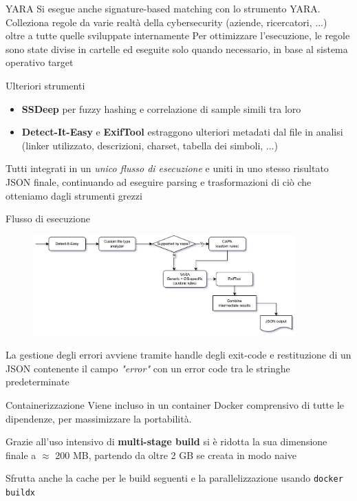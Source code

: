 \begin{frame}{YARA}
Si esegue anche signature-based matching con lo strumento YARA.
\vfill
Colleziona regole da varie realtà della cybersecurity (aziende, ricercatori, ...) \\
oltre a tutte quelle sviluppate internamente
\vfill
Per ottimizzare l'esecuzione, le regole sono state divise in cartelle ed eseguite solo quando necessario, in base al sistema operativo target
\end{frame}

\begin{frame}{Ulteriori strumenti}
\begin{itemize}
    \item \textbf{SSDeep} per fuzzy hashing e correlazione di sample simili tra loro
    \item \textbf{Detect-It-Easy} e \textbf{ExifTool} estraggono ulteriori metadati dal file in analisi (linker utilizzato, descrizioni, charset, tabella dei simboli, ...)
\end{itemize}

\vfill

Tutti integrati in un \emph{unico flusso di esecuzione} e uniti in uno stesso risultato JSON finale, continuando ad eseguire parsing e trasformazioni di ciò che otteniamo dagli strumenti grezzi
\end{frame}

\begin{frame}{Flusso di esecuzione}
\begin{figure}
    \centering
    \includegraphics[width=0.9\textwidth]{images/static_run_analysis_internal_tools.png}
\end{figure}
La gestione degli errori avviene tramite handle degli exit-code e restituzione di un JSON contenente il campo \emph{"error"} con un error code tra le stringhe predeterminate
\end{frame}

\begin{frame}{Containerizzazione}
Viene incluso in un container Docker comprensivo di tutte le dipendenze, per massimizzare la portabilità.

Grazie all'uso intensivo di \textbf{multi-stage build} si è ridotta la sua dimensione finale a $\approx$ 200 MB, partendo da oltre 2 GB se creata in modo naive

Sfrutta anche la cache per le build seguenti e la parallelizzazione usando \texttt{docker buildx}
\end{frame}

